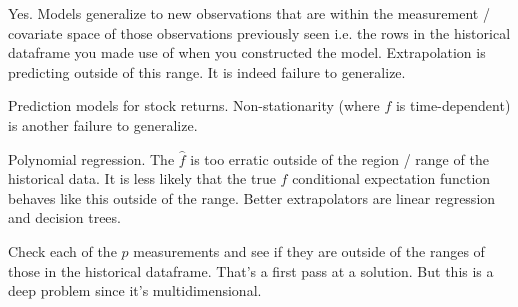 \documentclass[12pt]{article}
\begin{document}

\begin{enumerate}


Yes. Models generalize to new observations that are within the measurement / covariate space of those  observations previously seen i.e. the rows in the historical dataframe you made use of when you constructed the model. Extrapolation is predicting outside of this range. It is indeed failure to generalize.


Prediction models for stock returns. Non-stationarity (where $f$ is time-dependent) is another failure to generalize.


Polynomial regression. The $\hat{f}$ is too erratic outside of the region / range of the historical data. It is less likely that the true $f$ conditional expectation function behaves like this outside of the range. Better extrapolators are linear regression and decision trees.


Check each of the $p$ measurements and see if they are outside of the ranges of those in the historical dataframe. That's a first pass at a solution. But this is a deep problem since it's multidimensional.

\end{enumerate}

\end{document}
